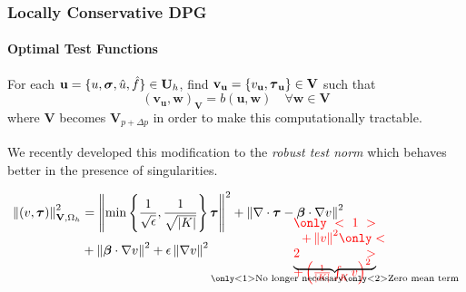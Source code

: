 \documentclass[18pt,xcolor=table]{beamer}
\newcounter{nn}
\begin{document}
\begin{frame}
\frametitle{Locally Conservative DPG}
\framesubtitle{Optimal Test Functions}
For each $\mathbf{u}=\{u,\boldsymbol\sigma,\hat u,\hat f\}\in\mathbf{U}_h$, find
$\mathbf{v}_{\mathbf{u}}=\{v_\mathbf{u},\boldsymbol\tau_\mathbf{u}\}\in\mathbf{V}$ such that
\[
(\mathbf{v_u},\mathbf{w})_\mathbf{V}=b(\mathbf{u},\mathbf{w})\quad\forall\mathbf{w}\in\mathbf{V}
\]
where $\mathbf{V}$ becomes $\mathbf{V}_{p+\Delta p}$ in order to make this
computationally tractable.

We recently developed this modification to the \emph{robust test norm}
\textsuperscript{\cite{ChanHeuerThanhDemkowicz2012}} which behaves better in
the presence of singularities.
\begin{minipage}[t][1.5in]{\textwidth}
\begin{align*}
\norm{(v,\bftau)}^2_{\mathbf{V},\Omega_h}&=
\norm{\min\left\{\frac{1}{\sqrt{\epsilon}},\frac{1}{\sqrt{|K|}}\right\}\bftau}^2
+\norm{\nabla\cdot\bftau-\bfbeta\cdot\nabla v}^2\\
&+\norm{\bfbeta\cdot\nabla v}^2+\epsilon\norm{\nabla v}^2
\underbrace{\color{red}{
\begin{minipage}[c][0.3in][c]{0.9in}$
\only<1>{
\hspace{1.5ex}
+\norm{v}^2
}
\only<2>{
+\left(\frac{1}{|K|}\int_Kv\right)^2
}$
\end{minipage}
}}_{\only<1>{\text{No longer necessary}}\only<2>{\text{Zero mean term}}}
\end{align*}
\end{minipage}
\end{frame}

\end{document}
